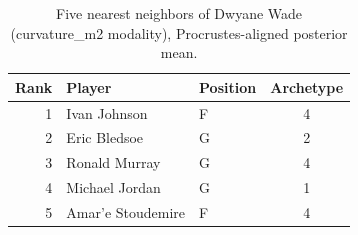 \begin{table}[htbp]
  \centering\small
  \begin{tabular}{rllc}
    \toprule
    Rank & Player & Position & Archetype \\
    \midrule
    1 & Ivan Johnson & F & 4 \\
    2 & Eric Bledsoe & G & 2 \\
    3 & Ronald Murray & G & 4 \\
    4 & Michael Jordan & G & 1 \\
    5 & Amar'e Stoudemire & F & 4 \\
    \bottomrule
  \end{tabular}
  \caption{Five nearest neighbors of Dwyane Wade (curvature_m2 modality), Procrustes-aligned posterior mean.}
  \label{tab:Dwyane_Wade_neighbors_curvature_m2}
\end{table}

